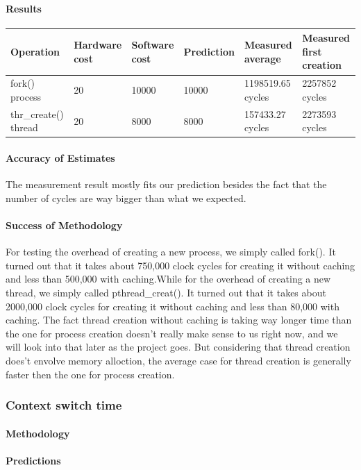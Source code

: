 \paragraph{Results}
\begin{center}
\begin{tabular}{| l | l | l | l | l | l |}
\hline
Operation & Hardware cost & Software cost & Prediction & Measured average & Measured first creation \\
\hline
fork() process 		& 20  & 10000  	& 10000 & 1198519.65 cycles & 2257852 cycles\\ \hline
thr\_create() thread 	& 20  & 8000	& 8000  &  157433.27 cycles & 2273593 cycles \\ \hline
\end{tabular}
\end{center}


\paragraph{Accuracy of Estimates}
The measurement result mostly fits our prediction besides the fact that the number of cycles are way bigger than what we expected.
\paragraph{Success of Methodology}
For testing the overhead of creating a new process, we simply called fork(). It turned out that it takes about 750,000 clock cycles for creating it without caching and less than 500,000 with caching.While for the overhead of creating a new thread, we simply called pthread\_creat(). It turned out that it takes about 2000,000 clock cycles for creating it without caching and less than 80,000 with caching.
The fact thread creation without caching is taking way longer time than the one for process creation doesn't really make sense to us right now, and we will look into that later as the project goes. But considering that thread creation does't envolve memory alloction, the average case for thread creation is generally faster then the one for process creation.


\subsubsection{Context switch time}
\paragraph{Methodology}
\paragraph{Predictions}
